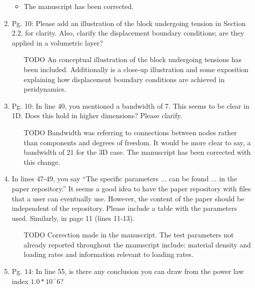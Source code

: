 \documentclass{article}
\begin{document}
\begin{enumerate}
{\color{red}  
\begin{itemize}
    \item
        The manuscript has been corrected.
  \end{itemize}}

\item
Pg. 10: Please add an illustration of the block undergoing tension in Section 2.2,
for clarity. Also, clarify the displacement boundary conditions; are they applied in a
volumetric layer?

{\color{red}  
\begin{itemize}
    \item
        [TODO]
        An conceptual illustration of the block undergoing tensions has been included. Additionally is a close-up illustration and some exposition explaining how displacement boundary conditions are achieved in peridynamics.
  \end{itemize}}

\item
Pg. 10: In line 40, you mentioned a bandwidth of 7. This seems to be clear in 1D.
Does this hold in higher dimensions? Please clarify.

{\color{red}  
\begin{itemize}
    \item
        [TODO]
        Bandwidth was referring to connections between nodes rather than components and degrees of freedom. It would be more clear to say, a bandwidth of 21 for the 3D case. The manuscript has been corrected with this change.
  \end{itemize}}

    \item
        In lines 47-49, you say “The speciﬁc parameters ... can be found ... in the
        paper repository.” It seems a good idea to have the paper repository with ﬁles that a
        user can eventually use. However, the content of the paper should be independent
        of the repository. Please include a table with the parameters used. Similarly, in
        page 11 (lines 11-13).

{\color{red}  
\begin{itemize}
    \item
        [TODO]
        Correction made in the manuscript. The test parameters not already reported throughout the manuscript include: material density
        and loading rates and information relevant to loading rates.
  \end{itemize}}

  \item
    Pg. 14: In line 55, is there any conclusion you can draw from the power law index
    $1.0 * 10^-6$?


\end{enumerate}
\end{document}
